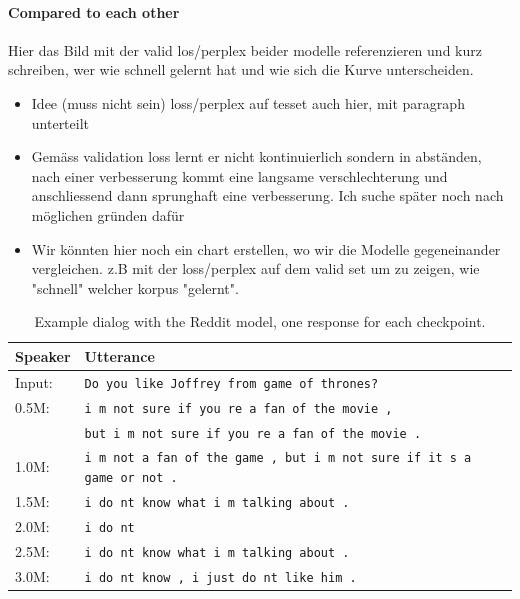 \paragraph{Compared to each other} Hier das Bild mit der valid los/perplex beider modelle referenzieren und kurz schreiben, wer wie schnell gelernt hat und wie sich die Kurve unterscheiden.

\begin{itemize}  
	\item Idee (muss nicht sein) loss/perplex auf tesset auch hier, mit paragraph unterteilt
	\item Gemäss validation loss lernt er nicht kontinuierlich sondern in abständen, nach einer verbesserung kommt eine langsame verschlechterung und anschliessend dann sprunghaft eine verbesserung. Ich suche später noch nach möglichen gründen dafür
	\item Wir könnten hier noch ein chart erstellen, wo wir die Modelle gegeneinander vergleichen. z.B mit der loss/perplex auf dem valid set um zu zeigen, wie "schnell" welcher korpus "gelernt".
\end{itemize}
\begin{table}[H]
	\centering
	\begin{adjustbox}{max width=\textwidth}
		\begin{tabular}{ll}
			\toprule
			Speaker & Utterance\\ \midrule
			Input: 	& \texttt{Do you like Joffrey from game of thrones?}\\
			0.5M: 	& \texttt{i m not sure if you re a fan of the movie ,}\\
					& \texttt{but i m not sure if you re a fan of the movie .}\\
			1.0M: 	& \texttt{i m not a fan of the game , but i m not sure if it s a game or not .}\\
			1.5M:	& \texttt{i do nt know what i m talking about .}\\
			2.0M:	& \texttt{i do nt }\\
			2.5M:	& \texttt{i do nt know what i m talking about .}\\
			3.0M:	& \texttt{i do nt know , i just do nt like him .}\\
			\bottomrule
		\end{tabular}
	\end{adjustbox}
	\caption{Example dialog with the Reddit model, one response for each checkpoint.}
	\label{results:example_output1:reddit}
\end{table}

